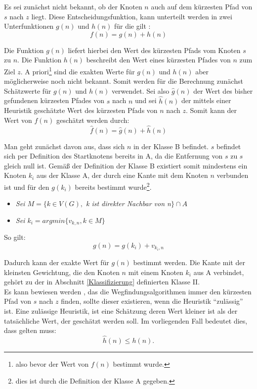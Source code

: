 		Es sei zunächst nicht bekannt, ob der Knoten $n$ auch auf dem kürzesten Pfad von $s$ nach $z$ liegt.
		Diese Entscheidungsfunktion, kann unterteilt werden in zwei Unterfunktionen $g(n)$ und $h(n)$ für die gilt \cite{Hart1968}:
		\begin{equation}
		f(n)=g(n)+h(n)
		\end{equation}
		
		Die Funktion $g(n)$ liefert hierbei den Wert des kürzesten Pfads vom Knoten $s$ zu $n$. Die Funktion $h(n)$ beschreibt den Wert eines kürzesten Pfades von $n$ zum Ziel $z$. A priori\footnote{also bevor der Wert von $f(n)$ bestimmt wurde.} sind die exakten Werte für $g(n)$ und $h(n)$ aber möglicherweise noch nicht bekannt. Somit werden für die Berechnung zunächst Schätzwerte für $g(n)$ und $h(n)$ verwendet. Sei also $\hat{g}(n)$ der Wert des bisher gefundenen kürzesten Pfades von $s$ nach $n$ und sei $\hat{h}(n)$ der mittels einer Heuristik geschätzte Wert des kürzesten Pfads von $n$ nach $z$. Somit kann der Wert von $f(n)$ geschätzt werden durch:
		\begin{equation}
			\hat{f}(n)=\hat{g}(n)+\hat{h}(n)
		\end{equation}
	
		Man geht zunächst davon aus, dass sich $n$ in der Klasse B befindet. $s$ befindet sich per Definition des Startknotens bereits in A, da die Entfernung von $s$ zu $s$ gleich null ist. Gemäß der Definition der Klasse B existiert somit mindestens ein Knoten $k_i$ aus der Klasse A, der durch eine Kante mit dem Knoten $n$ verbunden ist und für den $g(k_i)$ bereits bestimmt wurde\footnote{dies ist durch die Definition der Klasse A gegeben.}.
		\begin{itemize}
			\item \textit{Sei $M=\{k\in V(G),$ k ist direkter Nachbar von n$\} \cap A$}
			\item \textit{Sei $k_i=arg min\{v_{k,n},k\in M\}$}
		\end{itemize}
		 So gilt:
		\begin{equation}
			g(n)=g(k_i)+v_{k_i,n}
		\end{equation}
		
		Dadurch kann der exakte Wert für $g(n)$ bestimmt werden. Die Kante mit der kleinsten Gewichtung, die den Knoten $n$ mit einem Knoten $k_i$ aus A verbindet, gehört zu der in Abschnitt \ref{Klassifizierung} definierten Klasse II.\\
		Es kann bewiesen werden \cite{Hart1968}, das die Wegfindungsalgorithmen immer den kürzesten Pfad von $s$ nach $z$ finden, sollte dieser existieren, wenn die Heuristik "`zulässig"' ist. Eine zulässige Heuristik, ist eine Schätzung deren Wert kleiner ist als der tatsächliche Wert, der geschätzt werden soll. Im vorliegenden Fall bedeutet dies, dass gelten muss:
		\begin{equation}
			\hat{h}(n)\le h(n).
		\end{equation}
		
